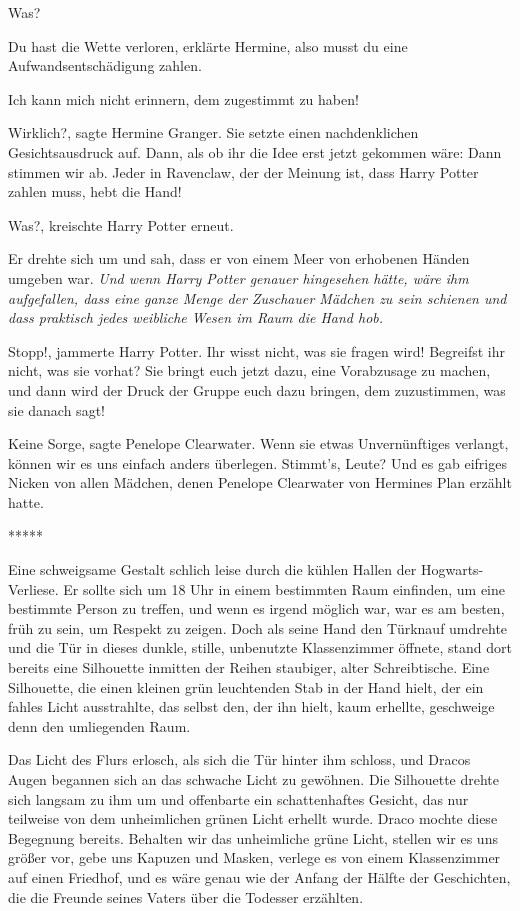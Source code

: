 \glqq{}Was?\grqq{}

\glqq{}Du hast die Wette verloren\grqq{}, erklärte Hermine, \glqq{}also musst du
eine Aufwandsentschädigung zahlen.\grqq{}

\glqq{}Ich kann mich nicht erinnern, dem zugestimmt zu haben!\grqq{}

\glqq{}Wirklich?\grqq{}, sagte Hermine Granger. Sie setzte einen nachdenklichen
Gesichtsausdruck auf. Dann, als ob ihr die Idee erst jetzt gekommen wäre: \glqq{}
Dann stimmen wir ab. Jeder in Ravenclaw, der der Meinung ist, dass Harry Potter
zahlen muss, hebt die Hand!\grqq{}

\glqq{}Was?\grqq{}, kreischte Harry Potter erneut.

Er drehte sich um und sah, dass er von einem Meer von erhobenen Händen umgeben
war. \emph{Und wenn Harry Potter genauer hingesehen hätte, wäre ihm aufgefallen,
dass eine ganze Menge der Zuschauer Mädchen zu sein schienen und dass praktisch
jedes weibliche Wesen im Raum die Hand hob.}

\glqq{}Stopp!\grqq{}, jammerte Harry Potter. \glqq{}Ihr wisst nicht, was sie
fragen wird! Begreifst ihr nicht, was sie vorhat? Sie bringt euch jetzt dazu,
eine Vorabzusage zu machen, und dann wird der Druck der Gruppe euch dazu
bringen, dem zuzustimmen, was sie danach sagt!\grqq{}

\glqq{}Keine Sorge\grqq{}, sagte Penelope Clearwater. \glqq{}Wenn sie etwas
Unvernünftiges verlangt, können wir es uns einfach anders überlegen. Stimmt's,
Leute?\grqq{} Und es gab eifriges Nicken von allen Mädchen, denen Penelope
Clearwater von Hermines Plan erzählt hatte.

\begin{center}*****\end{center}

Eine schweigsame Gestalt schlich leise durch die kühlen Hallen der
Hogwarts-Verliese. Er sollte sich um 18 Uhr in einem bestimmten Raum einfinden,
um eine bestimmte Person zu treffen, und wenn es irgend möglich war, war es am
besten, früh zu sein, um Respekt zu zeigen. Doch als seine Hand den Türknauf
umdrehte und die Tür in dieses dunkle, stille, unbenutzte Klassenzimmer öffnete,
stand dort bereits eine Silhouette inmitten der Reihen staubiger, alter
Schreibtische. Eine Silhouette, die einen kleinen grün leuchtenden Stab in der
Hand hielt, der ein fahles Licht ausstrahlte, das selbst den, der ihn hielt,
kaum erhellte, geschweige denn den umliegenden Raum.

Das Licht des Flurs erlosch, als sich die Tür hinter ihm schloss, und Dracos
Augen begannen sich an das schwache Licht zu gewöhnen. Die Silhouette drehte
sich langsam zu ihm um und offenbarte ein schattenhaftes Gesicht, das nur
teilweise von dem unheimlichen grünen Licht erhellt wurde. Draco mochte diese
Begegnung bereits. Behalten wir das unheimliche grüne Licht, stellen wir es uns
größer vor, gebe uns Kapuzen und Masken, verlege es von einem Klassenzimmer auf
einen Friedhof, und es wäre genau wie der Anfang der Hälfte der Geschichten, die
die Freunde seines Vaters über die Todesser erzählten.

